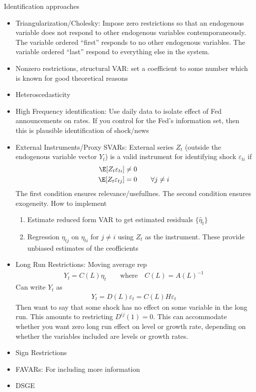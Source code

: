 \documentclass[12pt]{article}
\theoremstyle{plain}
\theoremstyle{definition}
\theoremstyle{remark}
\begin{document}
Identification approaches
\begin{itemize}
  \item Triangularization/Cholesky: Impose zero restrictions
    so that an endogenous variable does not respond to other endogenous
    variables contemporaneously.
    The variable ordered ``first'' responds to no other endogenous
    variables.
    The variable ordered ``last'' respond to everything else in the
    system.

  \item Nonzero restrictions, structural VAR: set a coefficient to some
    number which is known for good theoretical reasons

  \item Heteroscedasticity

  \item High Frequency identification: Use daily data to isolate effect
    of Fed announcements on rates. If you control for the Fed's
    information set, then this is plausible identification of shock/news

  \item
    External Instruments/Proxy SVARs:
    External series $Z_t$ (outside the endogenous variable vector $Y_t$)
    is a valid instrument for identifying shock $\varepsilon_{ti}$ if
    \begin{align*}
      \E[Z_t\varepsilon_{ti}] &\neq 0 \\
      \E[Z_t\varepsilon_{tj}] &= 0
      \qquad
      \forall j\neq i
    \end{align*}
    The first condition ensures relevance/usefullnes. The second
    condition ensures exogeneity.
    How to implement
    \begin{enumerate}
      \item Estimate reduced form VAR to get estimated residuals
        $\{\hat{\eta}_t\}$
      \item Regression $\eta_{tj}$ on $\eta_{ti}$ for $j\neq i$ using
        $Z_t$ as the instrument.
        These provide unbiased estimates of the ceofficients
    \end{enumerate}

  \item
    Long Run Restrictions:
    Moving average rep
    \begin{align*}
      Y_t = C(L)\eta_t
      \qquad\text{where}\quad
      C(L) = A(L)^{-1}
    \end{align*}
    Can write $Y_t$ as
    \begin{align*}
      Y_t = D(L)\varepsilon_t = C(L)H\varepsilon_t
    \end{align*}
    Then want to say that some shock has no effect on some variable in
    the long run. This amounts to restricting $D^{ij}(1)=0$.
    This can accommodate whether you want zero long run effect on level
    or growth rate, depending on whether the variables included are
    levels or growth rates.

  \item Sign Restrictions

  \item FAVARs: For including more information

  \item DSGE
\end{itemize}
\end{document}
